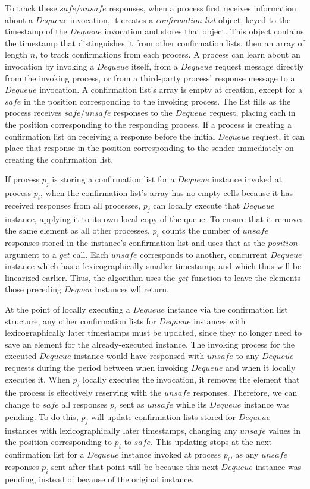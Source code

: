 \documentclass[a4paper,USenglish]{lipics-v2021} %
\begin{document}
To track these $safe$/$unsafe$ responses, when a process first receives information about a $Dequeue$ invocation, it creates a \emph{confirmation list} object, keyed to the timestamp of the $Dequeue$ invocation and stores that object.  This object contains the timestamp that distinguishes it from other confirmation lists, then an array of length $n$, to track confirmations from each process.  A process can learn about an invocation by invoking a $Dequeue$ itself, from a $Dequeue$ request message directly from the invoking process, or from a third-party process' response message to a $Dequeue$ invocation.  A confirmation list's array is empty at creation, except for a $safe$ in the position corresponding to the invoking process.  The list fills as the process receives $safe$/$unsafe$ responses to the $Dequeue$ request, placing each in the position corresponding to the responding process.  If a process is creating a confirmation list on receiving a response before the initial $Dequeue$ request, it can place that response in the position corresponding to the sender immediately on creating the confirmation list.

If process $p_j$ is storing a confirmation list for a $Dequeue$ instance invoked at process $p_i$, when the confirmation list's array has no empty cells because it has received responses from all processes, $p_j$ can locally execute that $Dequeue$ instance, applying it to its own local copy of the queue.  To ensure that it removes the same element as all other processes, $p_i$ counts the number of $unsafe$ responses stored in the instance's confirmation list and uses that as the $position$ argument to a $get$ call.  Each $unsafe$ corresponds to another, concurrent $Dequeue$ instance which has a lexicographically smaller timestamp, and which thus will be linearized earlier.  Thus, the algorithm uses the $get$ function to leave the elements those preceding $Dequeu$ instances wll return.

At the point of locally executing a $Dequeue$ instance via the confirmation list structure, any other confirmation lists for $Dequeue$ instances with lexicographically later timestamps must be updated, since they no longer need to save an element for the already-executed instance.  The invoking process for the executed $Dequeue$ instance would have responsed with $unsafe$ to any $Dequeue$ requests during the period between when invoking $Dequeue$ and when it locally executes it.  When $p_j$ locally executes the invocation, it removes the element that the process is effectively reserving with the $unsafe$ responses. Therefore, we can change to $safe$ all responses $p_i$ sent as $unsafe$ while its $Dequeue$ instance was pending.  To do this, $p_j$ will update confirmation lists stored for $Dequeue$ instances with lexicographically later timestamps, changing any $unsafe$ values in the position corresponding to $p_i$ to $safe$.  This updating stops at the next confirmation list for a $Dequeue$ instance invoked at process $p_i$, as any $unsafe$ responses $p_i$ sent after that point will be because this next $Dequeue$ instance was pending, instead of because of the original instance.
\end{document}
